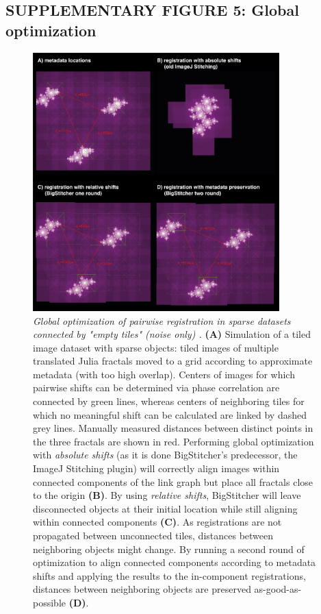 \documentclass[]{spie}  %
\begin{document}
\subsection*{SUPPLEMENTARY FIGURE 5: Global optimization}
\vspace{1mm}
\begin{figure}[h!]
\centerline{\includegraphics[width=0.85\textwidth]{fig-globalopt.jpg}}
\vspace{2.0mm}
\caption{\hspace{-0.5mm} \emph{Global optimization of pairwise registration in sparse datasets connected by "empty tiles" (noise only) .} \textbf{(A)} Simulation of a tiled image dataset with sparse objects: tiled images of multiple translated Julia fractals moved to a grid according to approximate metadata (with too high overlap). Centers of images for which pairwise shifts can be determined via phase correlation are connected by green lines, whereas centers of neighboring tiles for which no meaningful shift can be calculated are linked by dashed grey lines. Manually measured distances between distinct points in the three fractals are shown in red. Performing global optimization with \emph{absolute shifts} (as it is done BigStitcher's predecessor, the ImageJ Stitching plugin) will correctly align images within connected components of the link graph but place all fractals close to the origin \textbf{(B)}. By using \emph{relative shifts}, BigStitcher will leave disconnected objects at their initial location while still aligning within connected components \textbf{(C)}. As registrations are not propagated between unconnected tiles, distances between neighboring objects might change. By running a second round of optimization to align connected components according to metadata shifts and applying the results to the in-component registrations, distances between neighboring objects are preserved as-good-as-possible \textbf{(D)}.
}
\label{fig:sup-fig-globalopt}
\end{figure}
\end{document}
